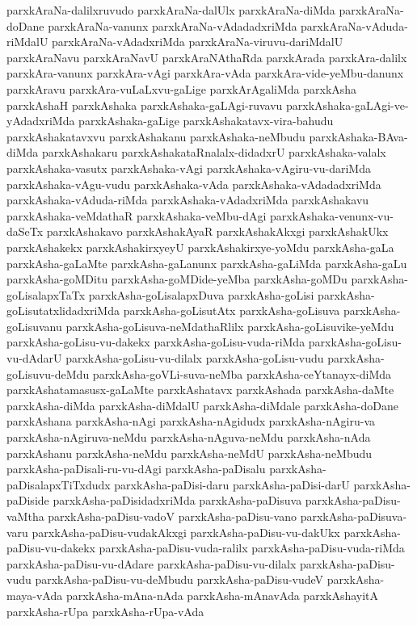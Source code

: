 {parxkAraNa-dalilxruvudo
parxkAraNa-dalUlx
parxkAraNa-diMda
parxkAraNa-doDane
parxkAraNa-vanunx
parxkAraNa-vAdadadxriMda
parxkAraNa-vAduda-riMdalU
parxkAraNa-vAdadxriMda
parxkAraNa-viruvu-dariMdalU
parxkAraNavu
parxkAraNavU
parxkAraNAthaRda
parxkArada
parxkAra-dalilx
parxkAra-vanunx
parxkAra-vAgi
parxkAra-vAda
parxkAra-vide-yeMbu-danunx
parxkAravu
parxkAra-vuLaLxvu-gaLige
parxkArAgaliMda
parxkAsha
parxkAshaH
parxkAshaka
parxkAshaka-gaLAgi-ruvavu
parxkAshaka-gaLAgi-ve-yAdadxriMda
parxkAshaka-gaLige
parxkAshakatavx-vira-bahudu
parxkAshakatavxvu
parxkAshakanu
parxkAshaka-neMbudu
parxkAshaka-BAva-diMda
parxkAshakaru
parxkAshakataRnalalx-didadxrU
parxkAshaka-valalx
parxkAshaka-vasutx
parxkAshaka-vAgi
parxkAshaka-vAgiru-vu-dariMda
parxkAshaka-vAgu-vudu
parxkAshaka-vAda
parxkAshaka-vAdadadxriMda
parxkAshaka-vAduda-riMda
parxkAshaka-vAdadxriMda
parxkAshakavu
parxkAshaka-veMdathaR
parxkAshaka-veMbu-dAgi
parxkAshaka-venunx-vu-daSeTx
parxkAshakavo
parxkAshakAyaR
parxkAshakAkxgi
parxkAshakUkx
parxkAshakekx
parxkAshakirxyeyU
parxkAshakirxye-yoMdu
parxkAsha-gaLa
parxkAsha-gaLaMte
parxkAsha-gaLanunx
parxkAsha-gaLiMda
parxkAsha-gaLu
parxkAsha-goMDitu
parxkAsha-goMDide-yeMba
parxkAsha-goMDu
parxkAsha-goLisalapxTaTx
parxkAsha-goLisalapxDuva
parxkAsha-goLisi
parxkAsha-goLisutatxlidadxriMda
parxkAsha-goLisutAtx
parxkAsha-goLisuva
parxkAsha-goLisuvanu
parxkAsha-goLisuva-neMdathaRlilx
parxkAsha-goLisuvike-yeMdu
parxkAsha-goLisu-vu-dakekx
parxkAsha-goLisu-vuda-riMda
parxkAsha-goLisu-vu-dAdarU
parxkAsha-goLisu-vu-dilalx
parxkAsha-goLisu-vudu
parxkAsha-goLisuvu-deMdu
parxkAsha-goVLi-suva-neMba
parxkAsha-ceYtanayx-diMda
parxkAshatamasusx-gaLaMte
parxkAshatavx
parxkAshada
parxkAsha-daMte
parxkAsha-diMda
parxkAsha-diMdalU
parxkAsha-diMdale
parxkAsha-doDane
parxkAshana
parxkAsha-nAgi
parxkAsha-nAgidudx
parxkAsha-nAgiru-va
parxkAsha-nAgiruva-neMdu
parxkAsha-nAguva-neMdu
parxkAsha-nAda
parxkAshanu
parxkAsha-neMdu
parxkAsha-neMdU
parxkAsha-neMbudu
parxkAsha-paDisali-ru-vu-dAgi
parxkAsha-paDisalu
parxkAsha-paDisalapxTiTxdudx
parxkAsha-paDisi-daru
parxkAsha-paDisi-darU
parxkAsha-paDiside
parxkAsha-paDisidadxriMda
parxkAsha-paDisuva
parxkAsha-paDisu-vaMtha
parxkAsha-paDisu-vadoV
parxkAsha-paDisu-vano
parxkAsha-paDisuva-varu
parxkAsha-paDisu-vudakAkxgi
parxkAsha-paDisu-vu-dakUkx
parxkAsha-paDisu-vu-dakekx
parxkAsha-paDisu-vuda-ralilx
parxkAsha-paDisu-vuda-riMda
parxkAsha-paDisu-vu-dAdare
parxkAsha-paDisu-vu-dilalx
parxkAsha-paDisu-vudu
parxkAsha-paDisu-vu-deMbudu
parxkAsha-paDisu-vudeV
parxkAsha-maya-vAda
parxkAsha-mAna-nAda
parxkAsha-mAnavAda
parxkAshayitA
parxkAsha-rUpa
parxkAsha-rUpa-vAda
}
